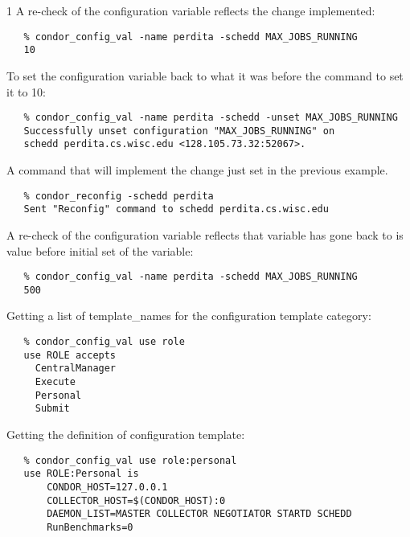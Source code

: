 \begin{ManPage}{\label{man-condor-config-val}}{1}
A re-check of the configuration variable reflects the change implemented:
\footnotesize
\begin{verbatim}
   % condor_config_val -name perdita -schedd MAX_JOBS_RUNNING
   10
\end{verbatim}
\normalsize

To set the configuration variable 
back to what it was before the command to set it to 10:
\footnotesize
\begin{verbatim}
   % condor_config_val -name perdita -schedd -unset MAX_JOBS_RUNNING
   Successfully unset configuration "MAX_JOBS_RUNNING" on 
   schedd perdita.cs.wisc.edu <128.105.73.32:52067>.
\end{verbatim}
\normalsize

A command that will implement the change just set in the previous
example.
\footnotesize
\begin{verbatim}
   % condor_reconfig -schedd perdita
   Sent "Reconfig" command to schedd perdita.cs.wisc.edu
\end{verbatim}
\normalsize

A re-check of the configuration variable reflects that variable
has gone back to is value before initial set of the variable:
\footnotesize
\begin{verbatim}
   % condor_config_val -name perdita -schedd MAX_JOBS_RUNNING
   500
\end{verbatim}
\normalsize

Getting a list of template\_names for the  configuration
template category:
\footnotesize
\begin{verbatim}
   % condor_config_val use role
   use ROLE accepts
     CentralManager
     Execute
     Personal
     Submit
\end{verbatim}
\normalsize

Getting the definition of  configuration template:
\footnotesize
\begin{verbatim}
   % condor_config_val use role:personal
   use ROLE:Personal is
   	   CONDOR_HOST=127.0.0.1
	   COLLECTOR_HOST=$(CONDOR_HOST):0
	   DAEMON_LIST=MASTER COLLECTOR NEGOTIATOR STARTD SCHEDD
	   RunBenchmarks=0
\end{verbatim}
\normalsize

\end{ManPage}

